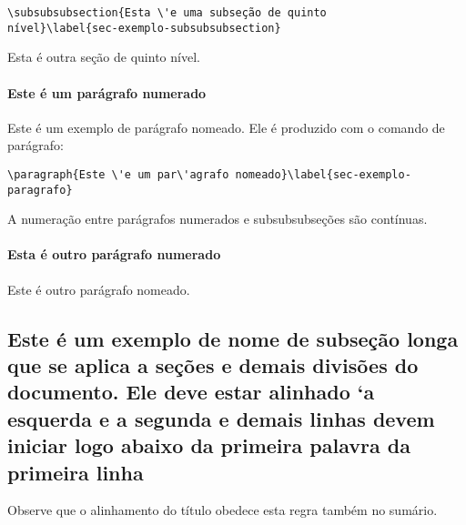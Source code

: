 \begin{verbatim}
\subsubsubsection{Esta \'e uma subseção de quinto
nível}\label{sec-exemplo-subsubsubsection}
\end{verbatim}

\label{sec-exemplo-subsubsubsection-outro}

Esta \'e outra seção de quinto nível.


\paragraph{Este \'e um par\'agrafo numerado}\label{sec-exemplo-paragrafo}

Este \'e um exemplo de par\'agrafo nomeado. Ele \'e produzido com o comando de
par\'agrafo:

\begin{verbatim}
\paragraph{Este \'e um par\'agrafo nomeado}\label{sec-exemplo-paragrafo}
\end{verbatim}

A numeração entre par\'agrafos numerados e subsubsubseções são contínuas.

\paragraph{Esta \'e outro par\'agrafo numerado}\label{sec-exemplo-paragrafo-outro}

Este \'e outro par\'agrafo nomeado.

\subsection{Este \'e um exemplo de nome de subseção longa que se aplica a seções e demais divisões do documento. Ele deve estar alinhado `a esquerda e a segunda e demais linhas devem iniciar logo abaixo da primeira palavra da primeira linha} 

Observe que o alinhamento do título obedece esta regra tamb\'em no sum\'ario.
	






